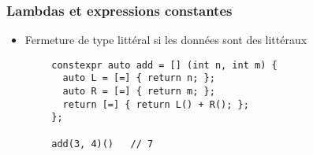 \documentclass[C++.tex]{subfiles}
\begin{document}
\begin{frame}[fragile]
	\frametitle{Lambdas et expressions constantes}
	\begin{itemize}
		\item Fermeture de type littéral si les données sont des littéraux
	\end{itemize}

	\begin{verbatim}
		constexpr auto add = [] (int n, int m) {
		  auto L = [=] { return n; };
		  auto R = [=] { return m; };
		  return [=] { return L() + R(); };
		};

		add(3, 4)()   // 7
	\end{verbatim}


\end{frame}
\end{document}
